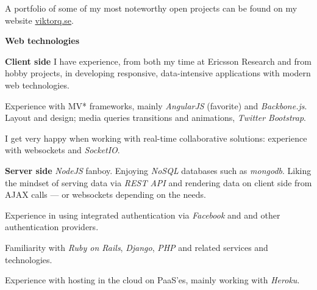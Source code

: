 \label{programming}

  A portfolio of some of my most noteworthy open projects can be found on my
  website \href{http://viktorq.se}{viktorq.se}.

\newenvironment{myitemize}{%
  \let\olditem\item
  \renewcommand\item[1][]{\olditem \textbf{##1}\hspace{0.35em}}
  \begin{list}{}{%
    \setlength{\leftmargin}{1.5em}
    \setlength{\itemsep}{0.25em}
    \setlength{\parskip}{0em}
    \setlength{\parsep}{0.25em}
  }
}{%
  \end{list}
}

\begin{myitemize}

  \item[Web technologies]
    \begin{list}{}{%
      \setlength{\leftmargin}{1.5em}
      \setlength{\itemsep}{0em}
      \setlength{\parskip}{0em}
      \setlength{\parsep}{0.25em}
    }
      \item[Client side]
        I have experience, from both my time at Ericsson Research and from hobby projects,
        in developing responsive, data-intensive applications
        with modern web technologies.

        Experience with MV* frameworks, mainly
        \emph{AngularJS} (favorite) and \emph{Backbone.js}. Layout and design; media queries
        transitions and animations, \emph{Twitter Bootstrap}.

        I get very happy when working
        with real-time collaborative solutions: experience with websockets and \emph{SocketIO}.
      \item[Server side]
        \emph{NodeJS} fanboy. Enjoying \emph{NoSQL} databases such as \emph{mongodb}.
        Liking the mindset of serving data via \emph{REST API} and rendering data on client side
        from AJAX calls --- or websockets depending on the needs.

        Experience in using integrated authentication via \emph{Facebook} and and other authentication
        providers.

        Familiarity with \emph{Ruby on Rails}, \emph{Django}, \emph{PHP} and related services
        and technologies.

        Experience with hosting in the cloud on PaaS'es, mainly working with \emph{Heroku}.
    \end{list}


\end{myitemize}
